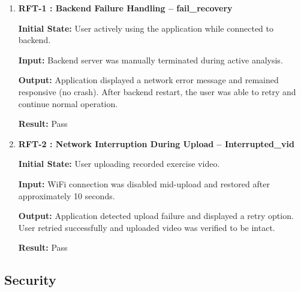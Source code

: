 \documentclass[12pt, titlepage]{article}
\begin{document}
\begin{enumerate}

\item \textbf{RFT-1 : Backend Failure Handling -- fail\_recovery}

\textbf{Initial State:} User actively using the application while connected to backend.

\textbf{Input:} Backend server was manually terminated during active analysis.

\textbf{Output:} Application displayed a network error message and remained responsive (no crash). After backend 
restart, the user was able to retry and continue normal operation.

\textbf{Result:} Pass

\vspace{0.5em}

\item \textbf{RFT-2 : Network Interruption During Upload -- Interrupted\_vid}

\textbf{Initial State:} User uploading recorded exercise video.

\textbf{Input:} WiFi connection was disabled mid-upload and restored after approximately 10 seconds.

\textbf{Output:} Application detected upload failure and displayed a retry option. User retried successfully and 
uploaded video was verified to be intact.

\textbf{Result:} Pass

\end{enumerate}

\subsection{Security}
\end{document}
